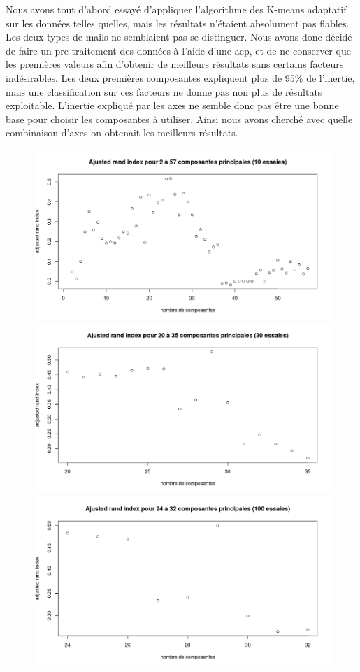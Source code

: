 \documentclass[a4paper, titlepage]{report}
\begin{document}
Nous avons tout d'abord essayé d'appliquer l'algorithme des K-means adaptatif sur les données telles quelles, mais les résultats n'étaient absolument pas fiables. Les deux types de mails ne semblaient pas se distinguer. Nous avons donc décidé de faire un pre-traitement des données à l'aide d'une acp, et de ne conserver que les premières valeurs afin d'obtenir de meilleurs résultats sans certains facteurs indésirables. Les deux premières composantes expliquent plus de 95\% de l'inertie, mais une classification sur ces facteurs ne donne pas non plus de résultats exploitable. L'inertie expliqué par les axes ne semble donc pas être une bonne base pour choisir les composantes à utiliser. Ainsi nous avons cherché avec quelle combinaison d'axes on obtenait les meilleurs résultats.

\begin{figure}[h]
	\begin{center}
		\includegraphics[scale = 0.30]{./doc/plot-ari-2-57.png}
		\includegraphics[scale = 0.20]{./doc/plot-ari-20-35.png}
		\includegraphics[scale = 0.20]{./doc/plot-ari-24-32.png}

\end{center}
\end{figure}
\end{document}
